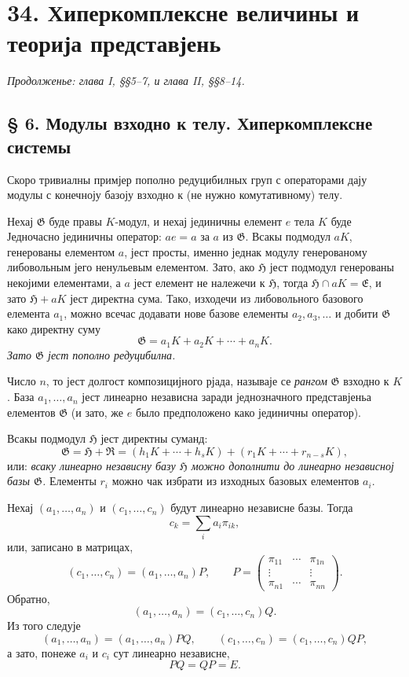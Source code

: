 ﻿\documentclass[11pt]{article}
\providecommand{\mG}{\mathfrak{G}}
\providecommand{\mE}{\mathfrak{E}}
\providecommand{\mH}{\mathfrak{H}}
\providecommand{\mR}{\mathfrak{R}}
\begin{document}
\setcounter{footnote}{11}
\section*{34. Хиперкомплексне величины и теорија представјень}
\emph{Продолженье: глава I, §§5--7, и глава II, §§8--14.}

\subsection*{§ 6. Модулы взходно к телу. Хиперкомплексне системы}

Скоро тривиалны примјер пополно редуцибилных груп с операторами дају модулы с конечноју базоју взходно к (не нужно комутативному) телу.

Нехај $\mG$ буде правы $K$-модул, и нехај јединичны елемент $e$ тела $K$ буде Једночасно јединичны оператор: $ae=a$ за $a$ из $\mG$. Всакы подмодул $aK$, генерованы елементом $a$, јест просты, именно једнак модулу генерованому либовольным јего ненульевым елементом. Зато, ако $\mH$ јест подмодул генерованы некојими елементами, а $a$ јест елемент не належечи к $\mH$, тогда $\mH\cap aK=\mE$, и зато $\mH+aK$ јест директна сума. Тако, изходечи из либовольного базового елемента $a_1$, можно всечас додавати нове базове елементы $a_2,a_3,\ldots$ и добити $\mG$ како директну суму
\[
        \mG=a_1K+a_2K+\cdots+a_nK.
\]
\emph{Зато $\mG$ јест пополно редуцибилна.}

Число $n$, то јест долгост композицијного рјада, называје се \emph{рангом} $\mG$ взходно к $K$. База $a_1,\ldots,a_n$ јест линеарно независна заради једнозначного представјеньа елементов $\mG$ (и зато, же $e$ было предположено како јединичны оператор).

Всакы подмодул $\mH$ јест директны суманд:
\[
        \mG=\mH+\mR=(h_1K+\cdots+h_sK)+(r_1K+\cdots+r_{n-s}K),
\]
или: \emph{всаку линеарно независну базу $\mH$ можно дополнити до линеарно независној базы $\mG$.} Елементы $r_i$ можно чак избрати из изходных базовых елементов $a_i$.

Нехај $(a_1,\ldots,a_n)$ и $(c_1,\ldots,c_n)$ будут линеарно независне базы. Тогда
\[
        c_k=\sum_i a_i\pi_{ik},
\]
или, записано в матрицах,
\[
        (c_1,\ldots,c_n)=(a_1,\ldots,a_n)P,
        \qquad
        P=\begin{pmatrix}
        \pi_{11}&\cdots&\pi_{1n}\\
        \vdots&&\vdots\\
        \pi_{n1}&\cdots&\pi_{nn}
        \end{pmatrix}.
\]
Обратно,
\[
        (a_1,\ldots,a_n)=(c_1,\ldots,c_n)Q.
\]
Из того следује
\[
        (a_1,\ldots,a_n)=(a_1,\ldots,a_n)PQ,
        \qquad
        (c_1,\ldots,c_n)=(c_1,\ldots,c_n)QP,
\]
а зато, понеже $a_i$ и $c_i$ сут линеарно независне,
\[
        PQ=QP=E.
\]
\end{document}
